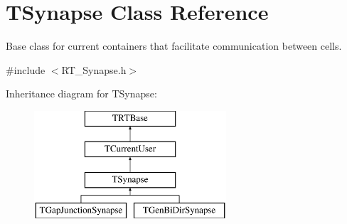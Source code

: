 \hypertarget{class_t_synapse}{\section{T\+Synapse Class Reference}
\label{class_t_synapse}
}


Base class for current containers that facilitate communication between cells.  




{\ttfamily \#include $<$R\+T\+\_\+\+Synapse.\+h$>$}

Inheritance diagram for T\+Synapse\+:\begin{figure}[H]
\begin{center}
\leavevmode
\includegraphics[height=4.000000cm]{class_t_synapse}
\end{center}
\end{figure}
